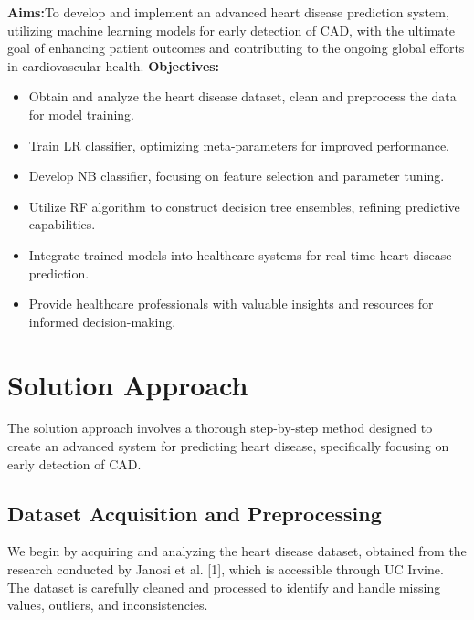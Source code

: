 \textbf{Aims:}To develop and implement an advanced heart disease prediction system, utilizing 
machine learning models for early detection of CAD, with the ultimate goal 
of enhancing patient outcomes and contributing to the ongoing global efforts in cardiovascular 
health.
\textbf{Objectives:}
\begin{itemize}
    \item Obtain and analyze the heart disease dataset, clean and preprocess the data for model training.
    \item Train LR classifier, optimizing meta-parameters for improved performance.
    \item Develop NB classifier, focusing on feature selection and parameter tuning.
    \item Utilize RF algorithm to construct decision tree ensembles, refining predictive capabilities.
    \item Integrate trained models into healthcare systems for real-time heart disease prediction.
    \item Provide healthcare professionals with valuable insights and resources for informed decision-making.
\end{itemize}



\section{Solution Approach}
\label{sec:intro_sol} %
The solution approach involves a thorough step-by-step method designed to create an advanced system for predicting heart disease, specifically focusing on early detection of CAD.

\subsection{Dataset Acquisition and Preprocessing}
We begin by acquiring and analyzing the heart disease dataset, obtained from the research conducted by Janosi et al. [1], which is accessible through UC Irvine. The dataset is carefully cleaned and processed to identify and handle missing values, outliers, and inconsistencies.

